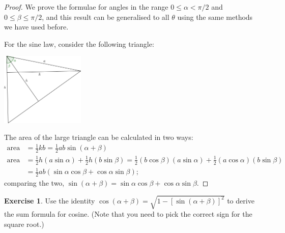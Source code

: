 \documentclass[a4paper,leqno]{article}
\numberwithin{equation}{section}
\theoremstyle{definition}
\newtheorem{exercise}[equation]{Exercise}
\theoremstyle{remark}
\begin{document}
\begin{proof}
  We prove the formulae for angles in the range $ 0 \leq \alpha < \pi/2 $ and $ 0 \leq \beta \leq \pi/2 $, and this
  result can be generalised to all $ \theta $ using the same methods we have used before.

  For the sine law, consider the following triangle:
  \begin{center}
    \includegraphics[width=0.3\textwidth]{sinesum2}
  \end{center}
  The area of the large triangle can be calculated in two ways:
  \begin{align*}
    \mathrm{area} &= \frac{1}{2}kb = \frac{1}{2} ab \sin(\alpha + \beta)\\
    \mathrm{area} &= \frac{1}{2}h(a\sin\alpha) + \frac{1}{2}h(b\sin\beta) = \frac{1}{2}(b \cos \beta)(a\sin\alpha) + \frac{1}{2}(a \cos \alpha)(b\sin\beta)\\
                  &= \frac{1}{2} ab (\sin \alpha \cos \beta + \cos \alpha \sin \beta);
  \end{align*}
  comparing the two, $ \sin (\alpha + \beta) = \sin \alpha \cos \beta + \cos \alpha \sin \beta $.
\end{proof}
\begin{exercise}
  Use the identity $ \cos(\alpha + \beta) = \sqrt{1 - [\sin(\alpha + \beta)]^2} $ to derive the sum formula for cosine.
  (Note that you need to pick the correct sign for the square root.)
\end{exercise}
\end{document}
